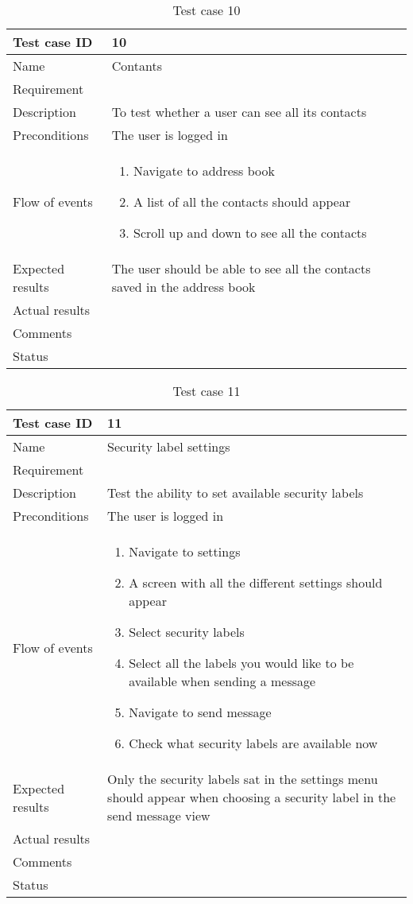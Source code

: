 \begin{table}
\begin{tabular}{l|p{10cm}}
Test case ID & 10 \\ \hline
Name & Contants\\ \hline
Requirement & \\ \hline
Description & To test whether a user can see all its contacts\\ \hline
Preconditions & The user is logged in\\ \hline
Flow of events & 
\begin{enumerate}
\item{}Navigate to address book
\item{}A list of all the contacts should appear
\item{}Scroll up and down to see all the contacts
\end{enumerate} \\ \hline
Expected results & The user should be able to see all the contacts saved in the address book\\ \hline \hline
Actual results & \\ \hline
Comments & \\ \hline
Status & 
\end{tabular}
\caption{Test case 10} \label{tab:case10}
\end{table}

\begin{table}
\begin{tabular}{l|p{10cm}}
Test case ID & 11 \\ \hline
Name & Security label settings\\ \hline
Requirement & \\ \hline
Description & Test the ability to set available security labels\\ \hline
Preconditions & The user is logged in\\ \hline
Flow of events & 
\begin{enumerate}
\item{}Navigate to settings
\item{}A screen with all the different settings should appear
\item{}Select security labels
\item{}Select all the labels you would like to be available when sending a message
\item{}Navigate to send message
\item{}Check what security labels are available now
\end{enumerate} \\ \hline
Expected results & Only the security labels sat in the settings menu should appear when choosing a security label in the send message view\\ \hline \hline
Actual results & \\ \hline
Comments & \\ \hline
Status & 
\end{tabular}
\caption{Test case 11} \label{tab:case11}
\end{table}
